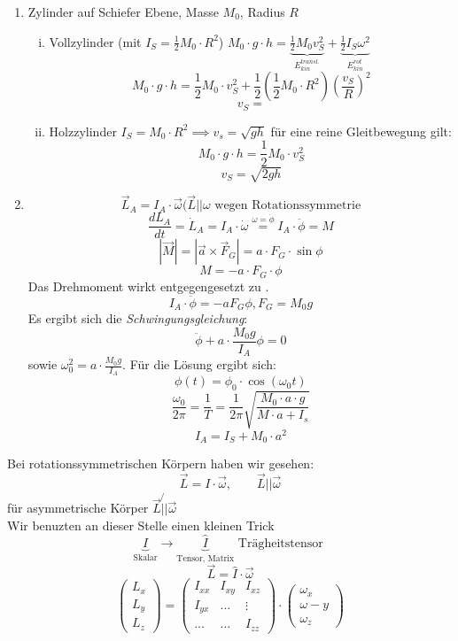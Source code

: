 \documentclass[a4paper,10pt]{scrartcl}
\begin{document}
\begin{exs}
\begin{enumerate}
 \item Zylinder auf Schiefer Ebene, Masse $M_0$, Radius $R$\\
\begin{enumerate}[i)]
 \item Vollzylinder (mit $I_S=\frac{1}{2} M_0 \cdot R^2$) $M_0 \cdot g \cdot h= \underbrace{\frac{1}{2} M_0 v_S^2}_{E^{transl.}_{kin}}+ \underbrace{\frac{1}{2} I_S \omega^2}_{E_{kin}^{rot}}$
\[
 M_0 \cdot g \cdot h = \frac{1}{2} M_0 \cdot v_S^2 + \frac{1}{2} \left( \frac{1}{2} M_0 \cdot R^2\right)\left( \frac{v_S}{R}\right )^2
\]
\[
 v_S=
\]
\item Holzzylinder $I_S=M_0 \cdot R^2 \implies v_s= \sqrt{gh}$ für eine reine Gleitbewegung gilt:
\[
 M_0\cdot g\cdot h= \frac{1}{2} M_0 \cdot v_S^2
\]
\[
 v_S=\sqrt{2 g h}
\]
\end{enumerate}
\item
\begin{sg}
\[
 \vec L_A = I_A \cdot \vec \omega (\vec L ||\omega \text{ wegen Rotationssymmetrie}
\]
\[
 \frac{dL_A}{dt}=\dot L_A= I_A\cdot \dot \omega \stackrel{\omega= \dot \phi}{=}I_A\cdot \ddot \phi= M
\]
\[
 |\vec M|= |\vec a \times \vec F_G|= a\cdot F_G \cdot \sin \phi
\]
\[
 M=-a\cdot F_G \cdot \phi
\]
Das Drehmoment wirkt entgegengesetzt zu \fixme.
\[
 I_A \cdot \ddot \phi= -a F_G \phi, F_G=M_0 g
\]
Es ergibt sich die \emph{Schwingungsgleichung}:
\[
 \boxed{\ddot \phi + a \cdot \frac{M_0 g}{I_A} \phi = 0}
\]
sowie $\omega_0^2= a\cdot \frac{M_0 g}{I_A}$. Für die Lösung ergibt sich:
\[
 \phi(t)=\phi_0 \cdot \cos( \omega_0 t)
\]
\[
 \frac{\omega_0}{2\pi}= \frac{1}{T}= \frac{1}{2\pi} \sqrt{\frac{M_0 \cdot a \cdot g}{M\cdot a + I_s}}
\]
\[
 \boxed{I_A= I_S + M_0 \cdot a^2}
\]
\end{sg}

\end{enumerate}
\end{exs}
\begin{sg}[Trägheitstensor]
Bei rotationssymmetrischen Körpern haben wir gesehen:
\[
 \vec L = I\cdot \vec \omega, \qquad \vec L ||\vec \omega
\]
für asymmetrische Körper $\vec L \not{||}  \vec \omega$ \\ %
Wir benuzten an dieser Stelle einen kleinen Trick
\[
 \underbrace{I}_{\text{Skalar}} \to \underbrace{\hat I}_{\text{Tensor, Matrix}} \text{ Trägheitstensor }
\]
\[
 \vec L = \hat I \cdot \vec \omega
\]
\[
 \begin{pmatrix} L_x \\ L_y \\ L_z \end{pmatrix} = \begin{pmatrix} I_{xx} & I_{xy} & I_{xz} \\ I_{yx} & ... & \vdots \\ ... & ... & I_{zz}  \end{pmatrix} \cdot \begin{pmatrix} \omega_x \\ \omega-y \\ \omega_z \end{pmatrix}
\]
\end{sg}
\end{document}

